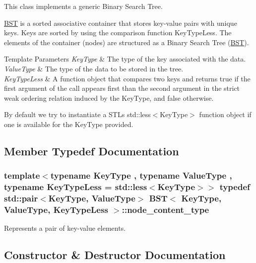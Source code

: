 This class implements a generic Binary Search Tree. 

\hyperlink{class_b_s_t}{B\+ST} is a sorted associative container that stores key-\/value pairs with unique keys. Keys are sorted by using the comparison function Key\+Type\+Less. The elements of the container (nodes) are structured as a Binary Search Tree (\hyperlink{class_b_s_t}{B\+ST}).


\begin{DoxyTemplParams}{Template Parameters}
{\em Key\+Type} & The type of the key associated with the data. \\
\hline
{\em Value\+Type} & The type of the data to be stored in the tree. \\
\hline
{\em Key\+Type\+Less} & A function object that compares two keys and returns true if the first argument of the call appears first than the second argument in the strict weak ordering relation induced by the Key\+Type, and false otherwise.\\
\hline
\end{DoxyTemplParams}
By default we try to instantiate a S\+TL\textquotesingle{}s std\+::less$<$\+Key\+Type$>$ function object if one is available for the Key\+Type provided. 

\subsection{Member Typedef Documentation}
\subsubsection[{\texorpdfstring{node\+\_\+content\+\_\+type}{node_content_type}}]{\setlength{\rightskip}{0pt plus 5cm}template$<$typename Key\+Type , typename Value\+Type , typename Key\+Type\+Less  = std\+::less$<$\+Key\+Type$>$$>$ typedef std\+::pair$<$Key\+Type, Value\+Type$>$ {\bf B\+ST}$<$ Key\+Type, Value\+Type, Key\+Type\+Less $>$\+::{\bf node\+\_\+content\+\_\+type}}\hypertarget{class_b_s_t_a0aa9307cbee74945dbbbf659c398d4a1}{}\label{class_b_s_t_a0aa9307cbee74945dbbbf659c398d4a1}


Represents a pair of key-\/value elements. 



\subsection{Constructor \& Destructor Documentation}
